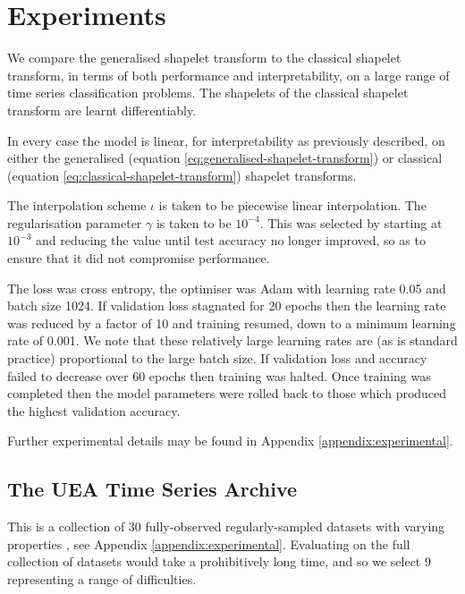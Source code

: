 \documentclass{article}
\theoremstyle{plain}
\theoremstyle{definition}
\begin{document}
	
\section{Experiments}\label{section:experiments}
We compare the generalised shapelet transform to the classical shapelet transform, in terms of both performance and interpretability, on a large range of time series classification problems. The shapelets of the classical shapelet transform are learnt differentiably.

In every case the model is linear, for interpretability as previously described, on either the generalised (equation \eqref{eq:generalised-shapelet-transform}) or classical (equation \eqref{eq:classical-shapelet-transform}) shapelet transforms.

The interpolation scheme $\iota$ is taken to be piecewise linear interpolation. %
The regularisation parameter $\gamma$ is taken to be $10^{-4}$. This was selected by starting at $10^{-3}$ and reducing the value until test accuracy no longer improved, so as to ensure that it did not compromise performance.

The loss was cross entropy, the optimiser was Adam \cite{kingma2015} with learning rate 0.05 and batch size 1024. If validation loss stagnated for 20 epochs then the learning rate was reduced by a factor of 10 and training resumed, down to a minimum learning rate of 0.001. We note that these relatively large learning rates are (as is standard practice) proportional to the large batch size. If validation loss and accuracy failed to decrease over 60 epochs then training was halted. Once training was completed then the model parameters were rolled back to those which produced the highest validation accuracy.

Further experimental details may be found in Appendix \ref{appendix:experimental}.

\subsection{The UEA Time Series Archive} \label{subsec:uea_classification}
This is a collection of 30 fully-observed regularly-sampled datasets with varying properties \cite{bagnall2018uea}, see Appendix \ref{appendix:experimental}. Evaluating on the full collection of datasets would take a prohibitively long time, and so we select 9 representing a range of difficulties.
\end{document}
